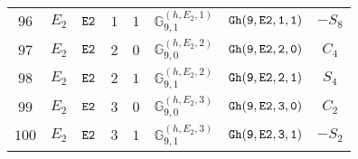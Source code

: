 \documentclass[fleqn,8pt]{jsarticle}
\begin{document}
\begin{table}[ht!]
\begin{center}
\begin{tabular}{cccccccc}
$ 96 $ & $ E_{2} $ & $ {\tt E2} $ & $ 1 $ & $ 1 $ & $ \mathbb{G}_{9,1}^{(h,E_{2},1)} $ & $ {\tt Gh(9,E2,1,1)} $ & $ - S_{8} $ \\
$ 97 $ & $ E_{2} $ & $ {\tt E2} $ & $ 2 $ & $ 0 $ & $ \mathbb{G}_{9,0}^{(h,E_{2},2)} $ & $ {\tt Gh(9,E2,2,0)} $ & $ C_{4} $ \\
$ 98 $ & $ E_{2} $ & $ {\tt E2} $ & $ 2 $ & $ 1 $ & $ \mathbb{G}_{9,1}^{(h,E_{2},2)} $ & $ {\tt Gh(9,E2,2,1)} $ & $ S_{4} $ \\
$ 99 $ & $ E_{2} $ & $ {\tt E2} $ & $ 3 $ & $ 0 $ & $ \mathbb{G}_{9,0}^{(h,E_{2},3)} $ & $ {\tt Gh(9,E2,3,0)} $ & $ C_{2} $ \\
$ 100 $ & $ E_{2} $ & $ {\tt E2} $ & $ 3 $ & $ 1 $ & $ \mathbb{G}_{9,1}^{(h,E_{2},3)} $ & $ {\tt Gh(9,E2,3,1)} $ & $ - S_{2} $ \\
 \hline \hline
\end{tabular}
\end{center}
\end{table}
\end{document}
